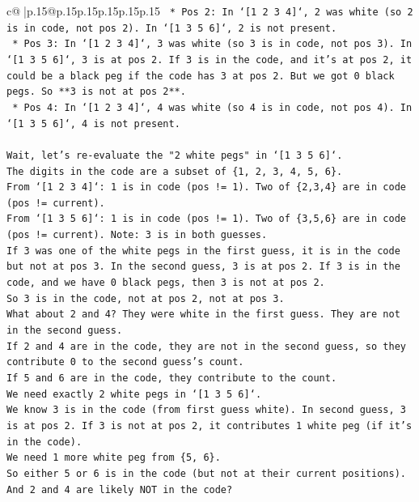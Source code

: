 \documentclass{article}
\begin{document}
{\begin{supertabular}{c@{$\;$}|p{.15\linewidth}@{}p{.15\linewidth}p{.15\linewidth}p{.15\linewidth}p{.15\linewidth}p{.15\linewidth}}
{{{\texttt{    *   Pos 2: In `{[}1 2 3 4{]}`, 2 was white (so 2 is in code, not pos 2). In `{[}1 3 5 6{]}`, 2 is not present.} \\
\texttt{    *   Pos 3: In `{[}1 2 3 4{]}`, 3 was white (so 3 is in code, not pos 3). In `{[}1 3 5 6{]}`, 3 is at pos 2. If 3 is in the code, and it's at pos 2, it could be a black peg if the code has 3 at pos 2. But we got 0 black pegs. So **3 is not at pos 2**.} \\
\texttt{    *   Pos 4: In `{[}1 2 3 4{]}`, 4 was white (so 4 is in code, not pos 4). In `{[}1 3 5 6{]}`, 4 is not present.} \\
\\ 
\texttt{Wait, let's re{-}evaluate the "2 white pegs" in `{[}1 3 5 6{]}`.} \\
\texttt{The digits in the code are a subset of \{1, 2, 3, 4, 5, 6\}.} \\
\texttt{From `{[}1 2 3 4{]}`: 1 is in code (pos != 1). Two of \{2,3,4\} are in code (pos != current).} \\
\texttt{From `{[}1 3 5 6{]}`: 1 is in code (pos != 1). Two of \{3,5,6\} are in code (pos != current). Note: 3 is in both guesses.} \\
\texttt{If 3 was one of the white pegs in the first guess, it is in the code but not at pos 3. In the second guess, 3 is at pos 2. If 3 is in the code, and we have 0 black pegs, then 3 is not at pos 2.} \\
\texttt{So 3 is in the code, not at pos 2, not at pos 3.} \\
\texttt{What about 2 and 4? They were white in the first guess. They are not in the second guess.} \\
\texttt{If 2 and 4 are in the code, they are not in the second guess, so they contribute 0 to the second guess's count.} \\
\texttt{If 5 and 6 are in the code, they contribute to the count.} \\
\texttt{We need exactly 2 white pegs in `{[}1 3 5 6{]}`.} \\
\texttt{We know 3 is in the code (from first guess white). In second guess, 3 is at pos 2. If 3 is not at pos 2, it contributes 1 white peg (if it's in the code).} \\
\texttt{We need 1 more white peg from \{5, 6\}.} \\
\texttt{So either 5 or 6 is in the code (but not at their current positions).} \\
\texttt{And 2 and 4 are likely NOT in the code?} \\
}}}
\end{supertabular}}
\end{document}

